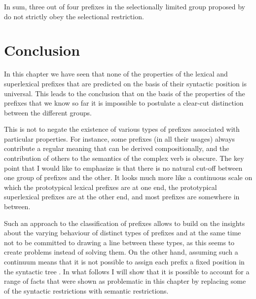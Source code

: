 In sum, three out of four prefixes in the selectionally limited group proposed by \citet{Tatevosov:09} do not strictly obey the selectional restriction. 

\section{Conclusion}\label{section:new:conclusion}
In this chapter we have seen that none of the properties of the lexical and superlexical prefixes  that are predicted on the basis of their syntactic position is universal. This leads to the conclusion that on the basis of the properties of the prefixes that we know so far it is impossible to postulate a clear-cut distinction between the different groups. 

This is not to negate the existence of various types of prefixes associated with particular properties. For instance, some prefixes (in all their usages) always contribute a regular meaning that can be derived compositionally, and the contribution of others to the semantics of the complex verb is obscure. The key point that I would like to emphasize is that there is no natural cut-off between one group of prefixes and the other. It looks much more like a continuous scale on which the prototypical lexical prefixes  are at one end, the prototypical superlexical prefixes  are at the other end, and most prefixes are somewhere in between. 

Such an approach to the classification of prefixes allows to build on the insights about the varying behaviour of distinct types of prefixes and at the same time not to be committed to drawing a line between these types, as this seems to create problems instead of solving them. On the other hand, assuming such a continuum means that it is not possible to assign each prefix a fixed position in the syntactic tree . In what follows I will show that it is possible to account for a range of facts that were shown as problematic in this chapter by replacing some of the syntactic restrictions with semantic restrictions.
